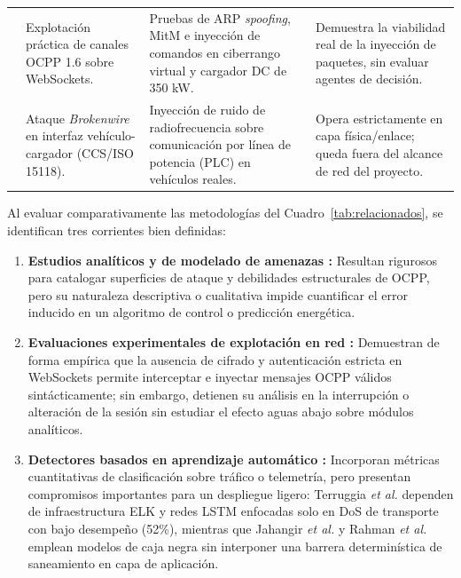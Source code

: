 \documentclass[conference]{IEEEtran}
\begin{document}
\begin{table}[t]
\begin{tabularx}{\textwidth}{c >{\raggedright\arraybackslash}p{4.2cm} >{\raggedright\arraybackslash}X >{\raggedright\arraybackslash}p{4.3cm}}
\addlinespace
\cite{elmo2023} & Explotación práctica de canales OCPP 1.6 sobre WebSockets. & Pruebas de ARP \textit{spoofing}, MitM e inyección de comandos en ciberrango virtual y cargador DC de 350 kW. & Demuestra la viabilidad real de la inyección de paquetes, sin evaluar agentes de decisión. \\
\addlinespace
\cite{kohler2023} & Ataque \textit{Brokenwire} en interfaz vehículo-cargador (CCS/ISO 15118). & Inyección de ruido de radiofrecuencia sobre comunicación por línea de potencia (PLC) en vehículos reales. & Opera estrictamente en capa física/enlace; queda fuera del alcance de red del proyecto. \\
\bottomrule
\end{tabularx}
\end{table}

Al evaluar comparativamente las metodologías del Cuadro~\ref{tab:relacionados}, se identifican tres corrientes bien definidas:
\begin{enumerate}
    \item \textbf{Estudios analíticos y de modelado de amenazas \cite{alcaraz2017,garofalaki2022,alcaraz2023}:} Resultan rigurosos para catalogar superficies de ataque y debilidades estructurales de OCPP, pero su naturaleza descriptiva o cualitativa impide cuantificar el error inducido en un algoritmo de control o predicción energética.
    \item \textbf{Evaluaciones experimentales de explotación en red \cite{elmo2023}:} Demuestran de forma empírica que la ausencia de cifrado y autenticación estricta en WebSockets permite interceptar e inyectar mensajes OCPP válidos sintácticamente; sin embargo, detienen su análisis en la interrupción o alteración de la sesión sin estudiar el efecto aguas abajo sobre módulos analíticos.
    \item \textbf{Detectores basados en aprendizaje automático \cite{jahangir2024,terruggia2025,rahman2026}:} Incorporan métricas cuantitativas de clasificación sobre tráfico o telemetría, pero presentan compromisos importantes para un despliegue ligero: Terruggia \textit{et al.} \cite{terruggia2025} dependen de infraestructura ELK y redes LSTM enfocadas solo en DoS de transporte con bajo desempeño (52\%), mientras que Jahangir \textit{et al.} \cite{jahangir2024} y Rahman \textit{et al.} \cite{rahman2026} emplean modelos de caja negra sin interponer una barrera determinística de saneamiento en capa de aplicación.
\end{enumerate}
\end{document}
